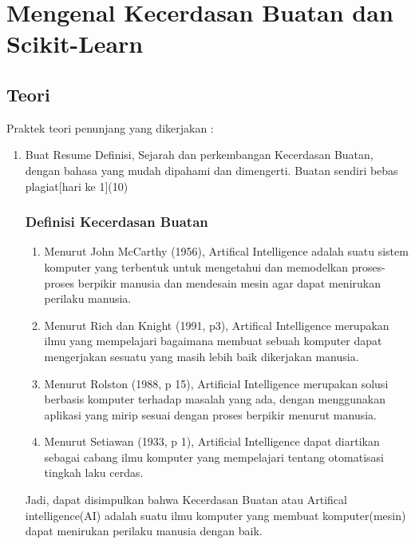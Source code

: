\chapter{Mengenal Kecerdasan Buatan dan Scikit-Learn}
\section{Teori}
Praktek teori penunjang yang dikerjakan :
\begin{enumerate}
\item
Buat Resume Definisi, Sejarah dan perkembangan Kecerdasan Buatan, dengan bahasa yang mudah dipahami dan dimengerti. Buatan sendiri bebas plagiat[hari ke 1](10)
\subsection{Definisi Kecerdasan Buatan}
\begin{enumerate}
\item Menurut John McCarthy (1956), Artifical Intelligence adalah suatu sistem komputer yang terbentuk untuk mengetahui dan memodelkan proses-proses berpikir manusia dan mendesain mesin agar dapat menirukan perilaku manusia. 
\item Menurut Rich dan Knight (1991, p3), Artifical Intelligence merupakan ilmu yang mempelajari bagaimana membuat sebuah komputer dapat mengerjakan sesuatu yang masih lebih baik dikerjakan manusia.  
\item Menurut Rolston (1988, p 15), Artificial Intelligence merupakan solusi berbasis komputer terhadap masalah yang ada, dengan menggunakan aplikasi yang mirip sesuai dengan proses berpikir menurut manusia.
\item Menurut Setiawan (1933, p 1), Artificial Intelligence dapat diartikan sebagai cabang ilmu komputer yang mempelajari tentang otomatisasi tingkah laku cerdas.
\end{enumerate}
\noindent
Jadi, dapat disimpulkan bahwa Kecerdasan Buatan atau Artifical intelligence(AI) adalah  suatu ilmu komputer yang membuat komputer(mesin) dapat menirukan perilaku manusia dengan baik. 

\end{enumerate}
